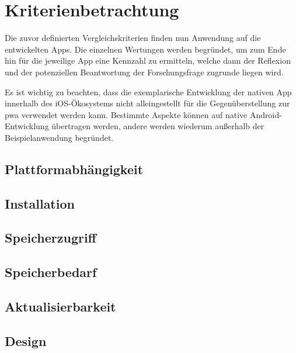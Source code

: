 \section{Kriterienbetrachtung}

Die zuvor definierten Vergleichskriterien finden nun Anwendung auf die entwickelten Apps. Die einzelnen Wertungen werden begründet, um zum Ende hin für die jeweilige App eine Kennzahl zu ermitteln, welche dann der Reflexion und der potenziellen Beantwortung der Forschungsfrage zugrunde liegen wird.

Es ist wichtig zu beachten, dass die exemplarische Entwicklung der nativen App innerhalb des iOS-Ökosystems nicht alleingestellt für die Gegenüberstellung zur \ac{pwa} verwendet werden kann. Bestimmte Aspekte können auf native Android-Entwicklung übertragen werden, andere werden wiederum außerhalb der Beispielanwendung begründet.

\subsection{Plattformabhängigkeit} \label{sec:6-plattform}


\subsection{Installation} \label{sec:6-installation}


\subsection{Speicherzugriff} \label{sec:6-speicherzugriff}


\subsection{Speicherbedarf} \label{sec:6-speicherbedarf}


\subsection{Aktualisierbarkeit} \label{sec:6-aktualisierbarkeit}


\subsection{Design} \label{sec:6-konsistenz-des-designs}


